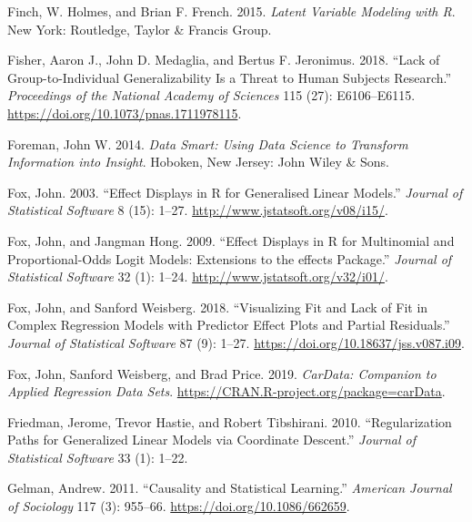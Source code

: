 \documentclass[
]{book}
\newlength{\cslhangindent}
\newenvironment{cslreferences}%
  {\setlength{\parindent}{0pt}%
  \everypar{\setlength{\hangindent}{\cslhangindent}}\ignorespaces}%
  {\par}
\begin{document}
\begin{cslreferences}
\leavevmode\hypertarget{ref-finchLatentVariableModeling2015}{}%
Finch, W. Holmes, and Brian F. French. 2015. \emph{Latent Variable Modeling with R}. New York: Routledge, Taylor \& Francis Group.

\leavevmode\hypertarget{ref-fisherLackGrouptoindividualGeneralizability2018}{}%
Fisher, Aaron J., John D. Medaglia, and Bertus F. Jeronimus. 2018. ``Lack of Group-to-Individual Generalizability Is a Threat to Human Subjects Research.'' \emph{Proceedings of the National Academy of Sciences} 115 (27): E6106--E6115. \url{https://doi.org/10.1073/pnas.1711978115}.

\leavevmode\hypertarget{ref-foremanDataSmartUsing2014}{}%
Foreman, John W. 2014. \emph{Data Smart: Using Data Science to Transform Information into Insight}. Hoboken, New Jersey: John Wiley \& Sons.

\leavevmode\hypertarget{ref-R-effects_b}{}%
Fox, John. 2003. ``Effect Displays in R for Generalised Linear Models.'' \emph{Journal of Statistical Software} 8 (15): 1--27. \url{http://www.jstatsoft.org/v08/i15/}.

\leavevmode\hypertarget{ref-R-effects_c}{}%
Fox, John, and Jangman Hong. 2009. ``Effect Displays in R for Multinomial and Proportional-Odds Logit Models: Extensions to the effects Package.'' \emph{Journal of Statistical Software} 32 (1): 1--24. \url{http://www.jstatsoft.org/v32/i01/}.

\leavevmode\hypertarget{ref-R-effects_a}{}%
Fox, John, and Sanford Weisberg. 2018. ``Visualizing Fit and Lack of Fit in Complex Regression Models with Predictor Effect Plots and Partial Residuals.'' \emph{Journal of Statistical Software} 87 (9): 1--27. \url{https://doi.org/10.18637/jss.v087.i09}.

\leavevmode\hypertarget{ref-R-carData}{}%
Fox, John, Sanford Weisberg, and Brad Price. 2019. \emph{CarData: Companion to Applied Regression Data Sets}. \url{https://CRAN.R-project.org/package=carData}.

\leavevmode\hypertarget{ref-friedmanRegularizationPathsGeneralized2010}{}%
Friedman, Jerome, Trevor Hastie, and Robert Tibshirani. 2010. ``Regularization Paths for Generalized Linear Models via Coordinate Descent.'' \emph{Journal of Statistical Software} 33 (1): 1--22.

\leavevmode\hypertarget{ref-gelmanCausalityStatisticalLearning2011}{}%
Gelman, Andrew. 2011. ``Causality and Statistical Learning.'' \emph{American Journal of Sociology} 117 (3): 955--66. \url{https://doi.org/10.1086/662659}.


\end{cslreferences}
\end{document}
